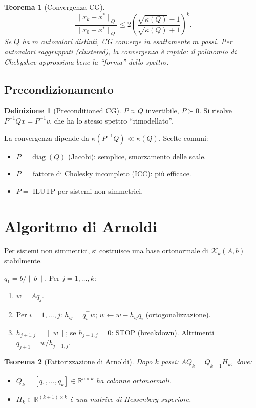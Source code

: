 \documentclass[11pt, a4paper, twoside]{book}
\theoremstyle{definition}
\newtheorem{defn}{Definizione}[chapter]
\theoremstyle{plain}
\newtheorem{thm}{Teorema}[chapter]
\theoremstyle{remark}
\DeclareMathOperator{\diag}{diag}
\newcommand{\R}{\mathbb{R}}
\begin{document}
\begin{thm}[Convergenza CG]
\[
  \frac{\|x_k - x^*\|_Q}{\|x_0 - x^*\|_Q} \leq 2\left(\frac{\sqrt{\kappa(Q)}-1}{\sqrt{\kappa(Q)}+1}\right)^k.
\]
Se $Q$ ha $m$ autovalori distinti, CG converge in esattamente $m$ passi. Per autovalori \emph{raggruppati} (clustered), la convergenza è rapida: il polinomio di Chebyshev approssima bene la ``forma'' dello spettro.
\end{thm}

\subsection{Precondizionamento}

\begin{defn}[Preconditioned CG]
$P \approx Q$ invertibile, $P \succ 0$. Si risolve $P^{-1}Qx = P^{-1}v$, che ha lo stesso spettro ``rimodellato''.
\end{defn}

La convergenza dipende da $\kappa(P^{-1}Q) \ll \kappa(Q)$. Scelte comuni:
\begin{itemize}
  \item $P = \diag(Q)$ (Jacobi): semplice, smorzamento delle scale.
  \item $P = $ fattore di Cholesky incompleto (ICC): più efficace.
  \item $P = $ ILUTP per sistemi non simmetrici.
\end{itemize}

\section{Algoritmo di Arnoldi}

Per sistemi non simmetrici, si costruisce una base ortonormale di $\mathcal{K}_k(A, b)$ stabilmente.

\begin{algobox}[Arnoldi]
$q_1 = b/\|b\|$. Per $j = 1, \ldots, k$:
\begin{enumerate}
  \item $w = Aq_j$.
  \item Per $i = 1, \ldots, j$: $h_{ij} = q_i^\top w$; $w \leftarrow w - h_{ij} q_i$ (ortogonalizzazione).
  \item $h_{j+1,j} = \|w\|$; se $h_{j+1,j} = 0$: STOP (breakdown). Altrimenti $q_{j+1} = w/h_{j+1,j}$.
\end{enumerate}
\end{algobox}

\begin{thm}[Fattorizzazione di Arnoldi]
Dopo $k$ passi: $AQ_k = Q_{k+1} H_k$, dove:
\begin{itemize}
  \item $Q_k = [q_1, \ldots, q_k] \in \R^{n \times k}$ ha colonne ortonormali.
  \item $H_k \in \R^{(k+1) \times k}$ è una matrice di Hessenberg superiore.
\end{itemize}
\end{thm}
\end{document}
